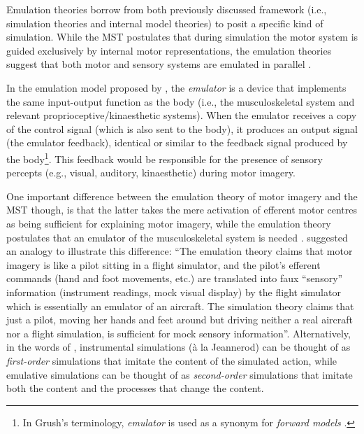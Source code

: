 \documentclass[a4paper,11pt,oneside,oldfontcommands]{memoir}
\let\rmarkdownfootnote\footnote%
\def\footnote{\protect\rmarkdownfootnote}
\begin{document}
Emulation theories
\citep[e.g.,][]{grush_emulation_2004, moulton_imagining_2009} borrow
from both previously discussed framework (i.e., simulation theories and
internal model theories) to posit a specific kind of simulation. While
the MST postulates that during simulation the motor system is guided
exclusively by internal motor representations, the emulation theories
suggest that both motor and sensory systems are emulated in parallel
\citep{grush_emulation_2004, oshea_does_2017}.

In the emulation model proposed by \citet{grush_emulation_2004}, the
\emph{emulator} is a device that implements the same input-output
function as the body (i.e., the musculoskeletal system and relevant
proprioceptive/kinaesthetic systems). When the emulator receives a copy
of the control signal (which is also sent to the body), it produces an
output signal (the emulator feedback), identical or similar to the
feedback signal produced by the body\footnote{In Grush's terminology,
  \emph{emulator} is used as a synonym for \emph{forward models}
  \citep[see][pages 378-379]{grush_emulation_2004}.}. This feedback
would be responsible for the presence of sensory percepts (e.g., visual,
auditory, kinaesthetic) during motor imagery.

One important difference between the emulation theory of motor imagery
and the MST though, is that the latter takes the mere activation of
efferent motor centres as being sufficient for explaining motor imagery,
while the emulation theory postulates that an emulator of the
musculoskeletal system is needed \citep[pages
384-385]{grush_emulation_2004}. \citet{grush_emulation_2004} suggested
an analogy to illustrate this difference: ``The emulation theory claims
that motor imagery is like a pilot sitting in a flight simulator, and
the pilot's efferent commands (hand and foot movements, etc.) are
translated into faux ``sensory'' information (instrument readings, mock
visual display) by the flight simulator which is essentially an emulator
of an aircraft. The simulation theory claims that just a pilot, moving
her hands and feet around but driving neither a real aircraft nor a
flight simulation, is sufficient for mock sensory information''.
Alternatively, in the words of \citet{moulton_imagining_2009},
instrumental simulations (à la Jeannerod) can be thought of as
\emph{first-order} simulations that imitate the content of the simulated
action, while emulative simulations can be thought of as
\emph{second-order} simulations that imitate both the content and the
processes that change the content.
\end{document}
